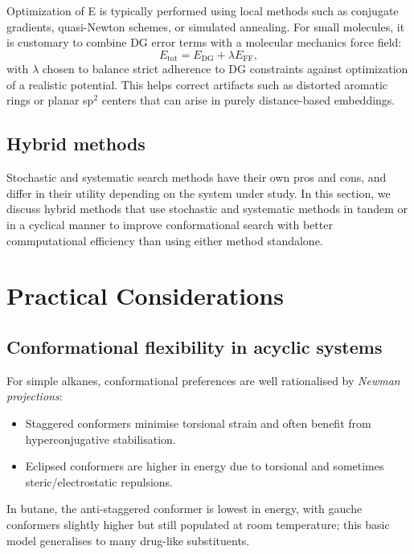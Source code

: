 \documentclass[12pt]{article}
\begin{document}
\begin{enumerate}
Optimization of E is typically performed using local methods such as conjugate gradients, quasi-Newton schemes, or simulated annealing. For small molecules, it is customary to combine DG error terms with a molecular mechanics force field:
\begin{equation}
 E_{\text{tot}} = E_{\text{DG}} + \lambda E_{\text{FF}},
\end{equation}
with $\lambda$ chosen to balance strict adherence to DG constraints against optimization of a realistic potential.\cite{CH2_spellmeyer_dg_conf_1997} This helps correct artifacts such as distorted aromatic rings or planar sp$^2$ centers that can arise in purely distance-based embeddings.\cite{CH2_riniker_landrum_2015}
\end{enumerate}


\subsection{Hybrid methods}

Stochastic and systematic search methods have their own pros and cons, and differ in their utility depending on the system under study. In this section, we discuss hybrid methods that use stochastic and systematic methods in tandem or in a cyclical manner to improve conformational search with better commputational efficiency than using either method standalone. 


\section{Practical Considerations}

\subsection{Conformational flexibility in acyclic systems}

For simple alkanes, conformational preferences are well rationalised by
\emph{Newman projections}:
\begin{itemize}
  \item Staggered conformers minimise torsional strain and often benefit from
        hyperconjugative stabilisation.
  \item Eclipsed conformers are higher in energy due to torsional and sometimes
        steric/electrostatic repulsions.
\end{itemize}
In butane, the anti-staggered conformer is lowest in energy, with gauche
conformers slightly higher but still populated at room temperature; this basic
model generalises to many drug-like substituents.
\end{document}
